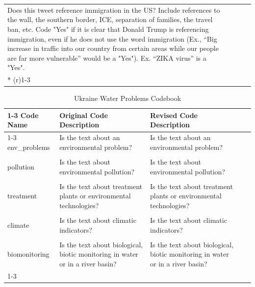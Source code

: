 \documentclass{article}
\begin{document}
\begin{longtable}{@{}lp{6cm}p{7cm}ll@{}}
  Does this tweet reference immigration in the US?  Include references to the wall, the   southern border, ICE, separation of families, the travel ban, etc. Code   "Yes" if it is clear that Donald Trump is referencing immigration,   even if he does not use the word immigration (Ex., “Big increase in traffic   into our country from certain areas while our people are far more vulnerable”   would be a "Yes").  Ex. “ZIKA   virus” is a "Yes". &
   &
   \\* \cmidrule(r){1-3}
\label{tbl:trump-code-desc}
\end{longtable}

\clearpage
\begin{table}[!htb] 
\caption{Ukraine Water Problems Codebook}
\vspace*{2.5mm}
\begin{tabular}{@{}lp{6cm}p{6cm}ll@{}} 
\cmidrule(r){1-3}
\textbf{Code   Name} & \textbf{Original   Code Description}        & \textbf{Revised   Code Description}         &  &  \\ \cmidrule(r){1-3}
env\_problems        & Is the text about an environmental problem? & Is the text about an environmental problem? &  &  \\ \\
pollution            & Is the text about environmental pollution?  & Is the text about environmental pollution?  &  &  \\ \\
treatment &
  Is the text about treatment plants or environmental   technologies? &
  Is the text about treatment plants or environmental   technologies? &
   &
   \\ \\
climate              & Is the text about climatic indicators?      & Is the text about climatic indicators?      &  &  \\ \\
biomonitoring &
  Is the text about biological, biotic monitoring in water or in a   river basin? &
  Is the text about biological, biotic monitoring in water or in a   river basin? &
   &
   \\ \cmidrule(r){1-3}
\end{tabular}
\end{table}
\end{document}

